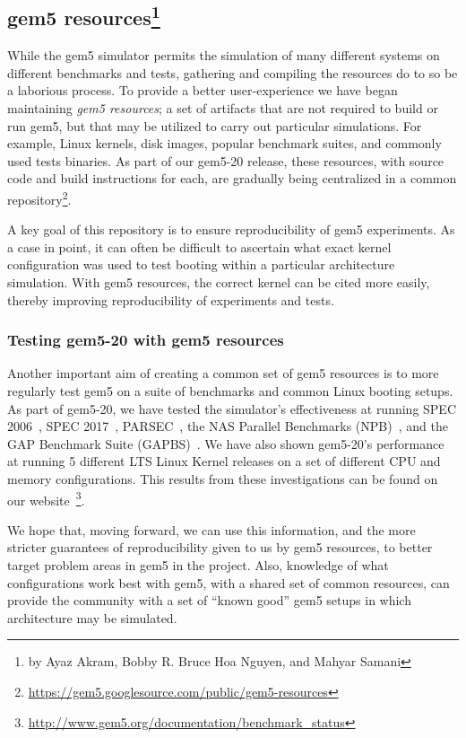 \subsection[gem5 resources]{gem5 resources\footnote{by Ayaz Akram, Bobby R. Bruce Hoa Nguyen, and Mahyar Samani}}

While the gem5 simulator permits the simulation of many different systems on
different benchmarks and tests, gathering and compiling the resources do to so
be a laborious process. To provide
a better user-experience we have began maintaining \emph{gem5
resources}; a set of artifacts
that are not required to build or run gem5, but that may be utilized to carry out
particular simulations. For example, Linux kernels, disk images, popular
benchmark suites, and commonly used tests binaries. As part of our gem5-20
release, these resources, with source code and build instructions for each, are
gradually being centralized in a common repository\footnote{
\url{https://gem5.googlesource.com/public/gem5-resources}}.

A key goal of this repository is to ensure reproducibility of gem5
experiments. As a case in point, it can often be difficult to ascertain what exact
kernel configuration was used to test booting within a particular architecture
simulation. With gem5 resources, the correct kernel can be cited more easily,
thereby improving reproducibility of experiments and tests.

\subsubsection{Testing gem5-20 with gem5 resources}

Another important aim of creating a common set of gem5 resources is to more
regularly test gem5 on a suite of benchmarks and common Linux booting setups.
As part of gem5-20, we have tested the simulator's effectiveness
at running SPEC 2006~\cite{spec06}, SPEC 2017~\cite{spec17},
PARSEC~\cite{parsec}, the NAS Parallel Benchmarks (NPB)~\cite{npb},
and the GAP Benchmark Suite (GAPBS)~\cite{gapbs}. We have also shown gem5-20's
performance at running 5 different LTS Linux Kernel releases on a set of
different CPU and memory configurations. This results from these investigations
can be found on our website~\footnote{
\url{http://www.gem5.org/documentation/benchmark_status}}.

We hope that, moving forward, we can use this information, and the more stricter
guarantees of reproducibility given to us by gem5 resources, to better target
problem areas in gem5 in the project. Also, knowledge of what configurations
work best with gem5, with a shared set of common resources, can provide
the community with a set of ``known good'' gem5 setups in which architecture
may be simulated.

